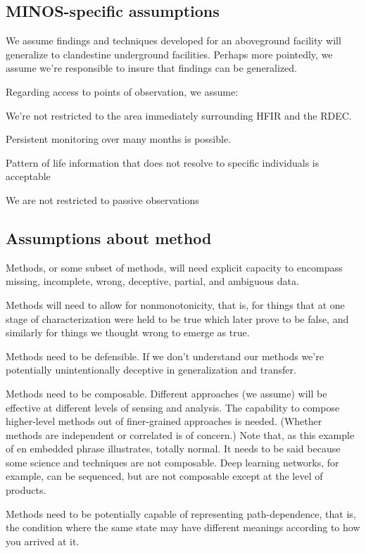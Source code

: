 \documentclass{article} %
\begin{document}
\subsection{MINOS-specific assumptions}
We assume findings and techniques developed for an aboveground facility will generalize to clandestine underground facilities. Perhaps more pointedly, we assume we're responsible to insure that findings can be generalized.

Regarding access to points of observation, we assume:
\begin{itemize*}
\item We're not restricted to the area immediately surrounding HFIR and the RDEC.
\item Persistent monitoring over many months is possible.
\item Pattern of life information that does not resolve to specific individuals is acceptable
\item We are not restricted to passive observations
\end{itemize*}

\subsection{Assumptions about method}
\begin{itemize*}
\item Methods, or some subset of methods, will need explicit capacity to encompass missing, incomplete, wrong, deceptive, partial, and ambiguous data. 
\item Methods will need to allow for nonmonotonicity, that is, for things that at one stage of characterization were held to be true which later prove to be false, and similarly for things we thought wrong to emerge as true.
\item Methods need to be defensible. If we don't understand our methods we're potentially unintentionally deceptive in generalization and transfer.
\item Methods need to be composable. Different approaches (we assume) will be effective at different levels of sensing and analysis. The capability to compose higher-level methods out of finer-grained approaches is needed. (Whether methods are independent or correlated is of concern.) Note that, as this example of en embedded phrase illustrates, totally normal. It needs to be said because some science and techniques are not composable. Deep learning networks, for example, can be sequenced, but are not composable except at the level of products.
\item Methods need to be potentially capable of representing path-dependence, that is, the condition where the same state may have different meanings according to how you arrived at it. 
\end{itemize*}
\end{document}
